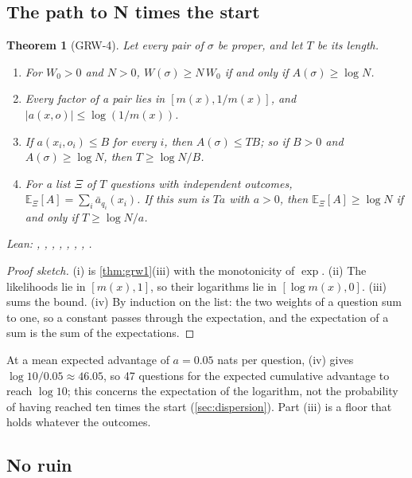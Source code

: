 \documentclass[11pt]{article}
\theoremstyle{plain}
\newtheorem{theorem}{Theorem}[section]
\theoremstyle{definition}
\theoremstyle{remark}
\newenvironment{leannames}{\par\smallskip\small\raggedright\upshape\noindent Lean: }{\par}
\newcommand{\E}{\mathbb{E}}
\newcommand{\abar}{\bar a}
\begin{document}
\subsection{The path to N times the start}

\begin{theorem}[GRW-4]
\label{thm:grw4}
Let every pair of $\sigma$ be proper, and let $T$ be its length.
\begin{enumerate}
  \item[(i)] For $W_0>0$ and $N>0$, $W(\sigma)\ge N\,W_0$ if and only if $A(\sigma)\ge\log N$.
  \item[(ii)] Every factor of a pair lies in $[m(x),1/m(x)]$, and $|a(x,o)|\le\log(1/m(x))$.
  \item[(iii)] If $a(x_i,o_i)\le B$ for every $i$, then $A(\sigma)\le TB$; so if $B>0$ and
    $A(\sigma)\ge\log N$, then $T\ge\log N/B$.
  \item[(iv)] For a list $\Xi$ of $T$ questions with independent outcomes,
    $\E_\Xi[A]=\sum_i\abar_{q_i}(x_i)$. If this sum is $Ta$ with $a>0$, then $\E_\Xi[A]\ge\log N$
    if and only if $T\ge\log N/a$.
\end{enumerate}
\begin{leannames}
, , , ,
, , ,
.
\end{leannames}
\end{theorem}

\begin{proof}[Proof sketch]
(i) is \cref{thm:grw1}(iii) with the monotonicity of $\exp$. (ii) The likelihoods lie in
$[m(x),1]$, so their logarithms lie in $[\log m(x),0]$. (iii) sums the bound. (iv) By induction on
the list: the two weights of a question sum to one, so a constant passes through the expectation,
and the expectation of a sum is the sum of the expectations.
\end{proof}

At a mean expected advantage of $a=0.05$ nats per question, (iv) gives $\log10/0.05\approx46.05$,
so 47 questions for the expected cumulative advantage to reach $\log10$; this concerns the
expectation of the logarithm, not the probability of having reached ten times the start
(\cref{sec:dispersion}). Part (iii) is a floor that holds whatever the outcomes.

\subsection{No ruin}
\end{document}
